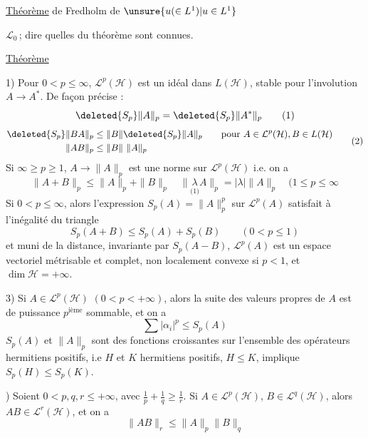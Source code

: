 \uline{Théorème}  de Fredholm de $\unsure{u(\in L^1)|u\in L^1}$ 

 $\mathcal L_0$\,; dire   quelles
 du  théorème \unsure{--} sont connues.

\uline{Théorème}

1) Pour  $0<p\leq\infty$, $\mathcal L^p(\mathcal H)$ est un idéal 
dans $L(\mathcal H)$, stable pour l'involution $A\to A^*$. De
 façon précise :
\[
\deleted{S_p}\|A\|_p=\deleted{S_p}\|A^*\|_p \tag*{(1)}
\]
\[
\begin{aligned}
\deleted{S_p}\|BA\|_p&\leq\|B\|\deleted{S_p}\|A\|_p
\qquad\text{pour } A\in\mathcal L^p(\mathcal H),B\in L(\mathcal H)\\
\|AB\|_p&\leq\|B\|\ \|A\|_p
\end{aligned}\tag*{(2)}
\]
Si $\infty\geq p\geq1$, $A\to\|A\|_p$ est une norme sur $\mathcal L^p(\mathcal H)$ 
i.e. on a
\[
\|A+B\|_p\leq\|A\|_p+\|B\|_p\quad\|\underset{\text{(1)}}{\lambda} A\|_p=|\lambda|\|A\|_p
\quad(1\leq p\leq\infty\tag*{(3)}
\]
Si $0<p\leq\infty$, alors l'expression $S_p(A)=\|A\|_p^p$ sur
$\mathcal L^p(A)$ satisfait à l'inégalité du triangle
\[
S_p(A+B)\leq S_p(A)+S_p(B)\qquad(0<p\leq1)\tag*{(4)}
\]
et muni de la distance, invariante par 
$S_p(A-B)$, $\mathcal L^p(A)$ est un espace vectoriel 
métrisable et complet, non localement convexe
si $p<1$, et $\dim\mathcal H=+\infty$.

3) Si $A\in\mathcal L^p(\mathcal H)$ $(0<p<+\infty)$, alors la suite
des valeurs propres  de $A$ est de puissance
$p^{\mathrm{ième}}$ sommable, et on a
\[
\sum|\alpha_i|^p\leq S_p(A)\tag*{(5)}
\]
$S_p(A)$ et $\|A\|_p$ sont des fonctions croissantes
sur l'ensemble des opérateurs hermitiens
positifs, i.e $H$ et $K$ hermitiens positifs, $H\leq K$,
implique $S_p(H)\leq S_p(K)$.

) Soient $0<p,q,r\leq+\infty$, avec $\frac{1}{p}+\frac{1}{q}\geq\frac{1}{r}$. Si 
$A\in\mathcal L^p(\mathcal H)$, $B\in\mathcal L^q(\mathcal H)$, alors $AB\in\mathcal L^r(\mathcal H)$, et on a
\[
\|AB\|_r\leq\|A\|_p\|B\|_q\tag*{(6)}
\]
